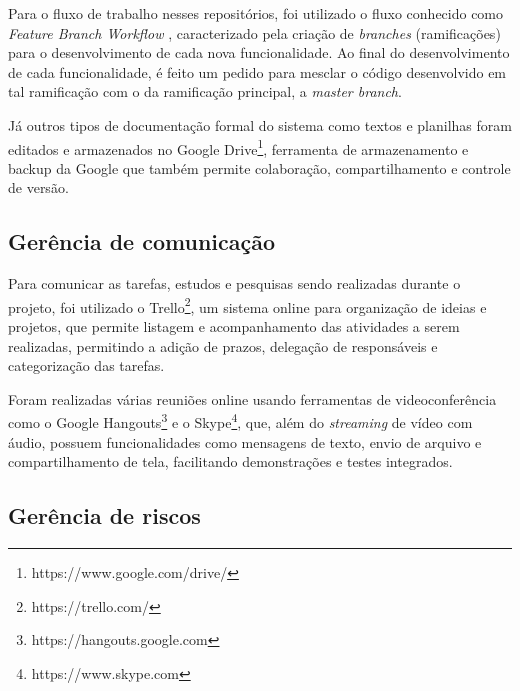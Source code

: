 
Para o fluxo de trabalho nesses repositórios, foi utilizado o fluxo conhecido como \textit{Feature Branch Workflow} \cite{atlassian}, caracterizado pela criação de \textit{branches} (ramificações) para o desenvolvimento de cada nova funcionalidade. Ao final do desenvolvimento de cada funcionalidade, é feito um pedido para mesclar o código desenvolvido em tal ramificação com o da ramificação principal, a \textit{master branch}.

Já outros tipos de documentação formal do sistema como textos e planilhas foram editados e armazenados no Google Drive\footnote{https://www.google.com/drive/}, ferramenta de armazenamento e backup da Google que também permite colaboração, compartilhamento e controle de versão.


\subsection{Gerência de comunicação}

Para comunicar as tarefas, estudos e pesquisas sendo realizadas durante o projeto, foi utilizado o Trello\footnote{https://trello.com/}, um sistema online para organização de ideias e projetos, que permite listagem e acompanhamento das atividades a serem realizadas, permitindo a adição de prazos, delegação de responsáveis e categorização das tarefas.

Foram realizadas várias reuniões online usando ferramentas de videoconferência como o Google Hangouts\footnote{https://hangouts.google.com} e o Skype\footnote{https://www.skype.com}, que, além do \emph{streaming} de vídeo com áudio, possuem funcionalidades como mensagens de texto, envio de arquivo e compartilhamento de tela, facilitando demonstrações e testes integrados.

\subsection{Gerência de riscos}

